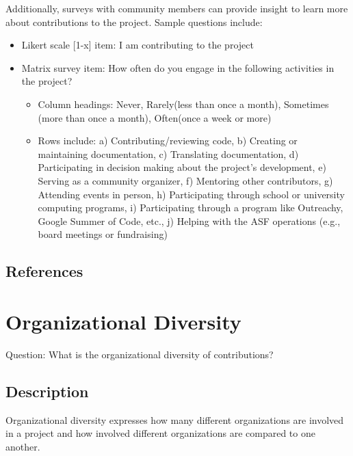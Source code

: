 \documentclass[
  12pt,
]{article}
\providecommand{\tightlist}{%
  \setlength{\itemsep}{0pt}\setlength{\parskip}{0pt}}
\begin{document}
Additionally, surveys with community members can provide insight to
learn more about contributions to the project. Sample questions include:

\begin{itemize}
\tightlist
\item
  Likert scale {[}1-x{]} item: I am contributing to the project
\item
  Matrix survey item: How often do you engage in the following
  activities in the project?

  \begin{itemize}
  \tightlist
  \item
    Column headings: Never, Rarely(less than once a month), Sometimes
    (more than once a month), Often(once a week or more)
  \item
    Rows include: a) Contributing/reviewing code, b) Creating or
    maintaining documentation, c) Translating documentation, d)
    Participating in decision making about the project's development, e)
    Serving as a community organizer, f) Mentoring other contributors,
    g) Attending events in person, h) Participating through school or
    university computing programs, i) Participating through a program
    like Outreachy, Google Summer of Code, etc., j) Helping with the ASF
    operations (e.g., board meetings or fundraising)
  \end{itemize}
\end{itemize}

\hypertarget{references-8}{%
\subsection{References}\label{references-8}}

\hypertarget{organizational-diversity}{%
\section{Organizational Diversity}\label{organizational-diversity}}

Question: What is the organizational diversity of contributions?

\hypertarget{description-9}{%
\subsection{Description}\label{description-9}}

Organizational diversity expresses how many different organizations are
involved in a project and how involved different organizations are
compared to one another.
\end{document}
